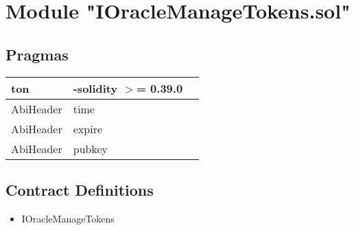
\section{Module "IOracleManageTokens.sol"}


\subsection{Pragmas}


\noindent\begin{tabular}{|l|l|p{5cm}|}\hline
ton & -solidity $>$= 0.39.0 &\\\hline
AbiHeader &  time &\\\hline
AbiHeader &  expire &\\\hline
AbiHeader &  pubkey &\\\hline
\end{tabular}


\subsection{Contract Definitions}

\begin{itemize}
\item IOracleManageTokens
\end{itemize}
